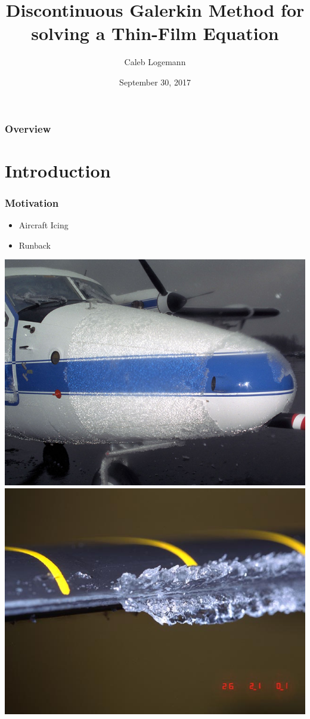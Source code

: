 \documentclass[10pt]{beamer}
\title[]{Discontinuous Galerkin Method for solving a Thin-Film Equation} %
\author{Caleb Logemann} %
\institute[Iowa State University]{%
Mathematics Department, Iowa State University \\ %
\medskip
\textit{logemann@iastate.edu}} %
\date{September 30, 2017} %
\begin{document}
  \begin{frame}
    \titlepage{}
  \end{frame}

  \begin{frame}
    \frametitle{Overview}
    \tableofcontents
  \end{frame}

  \section{Introduction}
    \begin{frame}
      \frametitle{Motivation}
      \begin{itemize}
        \item Aircraft Icing
        \item Runback
      \end{itemize}
      \begin{center}
        \includegraphics[scale=0.2]{Figures/Icing_on_a_plane.jpg}
        \hspace{0.1in}
        \includegraphics[scale=0.2]{Figures/Icing_on_a_rotor.jpg}

\end{center}
\end{frame}
\end{document}
